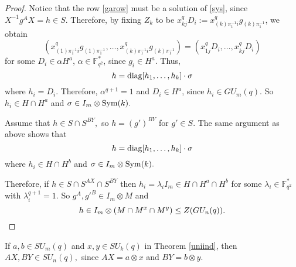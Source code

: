 \begin{proof}
Notice that the row \eqref{garow} must be a solution of \eqref{sys}, since $X^{-1}g^AX=h \in S.$ Therefore, by fixing $Z_k$ to be $x_{kj}^q D_i:=x_{(k)\pi_1^{-1}i}^q g_{(k)\pi_1^{-1}}$, we obtain 
$$(x_{(1)\pi_1^{-1}i}^q g_{(1)\pi_1^{-1}}, \ldots, x_{(k)\pi_1^{-1}i}^q g_{(k)\pi_1^{-1}})=(x_{1j}^q D_i, \ldots, x_{kj}^q D_i)$$
for some $D_i \in \alpha H^a$, $\alpha \in \mathbb{F}_{q^2}^*$, since $g_i \in H^a.$ Thus, %
$$h=\mathrm{diag}[h_1, \ldots, h_k] \cdot \sigma$$
where $h_i = D_i$. Therefore, $\alpha^{q+1}=1$ and $D_i \in H^a$, since $h_i \in GU_m(q).$ So $h_i\in H \cap H^a$ and $\sigma \in I_m \otimes \mathrm{Sym}(k).$ 

Assume that $h \in S\cap S^{BY},$  so $h =(g')^{BY}$ for $g' \in S$. The same argument as above shows that 
$$h=\mathrm{diag}[h_1, \ldots, h_k] \cdot \sigma$$
where $h_i \in H \cap H^b$ and $\sigma \in I_m \otimes \mathrm{Sym}(k).$ 

Therefore, if $h \in S \cap S^{AX} \cap S^{BY}$ then  $h_i = \lambda_i I_m \in H \cap H^a \cap H^b$ for some $\lambda_i \in \mathbb{F}_{q^2}^*$ with $\lambda_i^{q+1}=1$. So $g^A, g'^B \in  I_m \otimes M$ and 
\begin{equation*}
h \in  I_m \otimes (M \cap M^x \cap M^y) \le Z(GU_n(q)). \qedhere
\end{equation*} 
\end{proof}

\begin{Rem}\label{uniindSL}
If $a,b \in SU_m(q)$ and $x,y \in SU_k(q)$ in Theorem \ref{uniind}, then $AX, BY \in SU_n(q),$ since $AX=a \otimes x$ and $BY=b \otimes y.$
\end{Rem}

